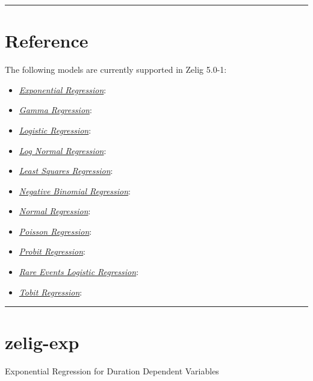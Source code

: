 \documentclass[letterpaper,10pt,english]{sphinxmanual}
\begin{document}
\bigskip\hrule{}\bigskip



\section{Reference}
\label{vignette:reference}
The following models are currently supported in Zelig 5.0-1:
\begin{itemize}
\item {} 
{\hyperref[zelig-exp:zexp]{\emph{Exponential Regression}}}: 

\item {} 
{\hyperref[zelig-gamma:zgamma]{\emph{Gamma Regression}}}: 

\item {} 
{\hyperref[zelig-logit:zlogit]{\emph{Logistic Regression}}}: 

\item {} 
{\hyperref[zelig-lognorm:zlognorm]{\emph{Log Normal Regression}}}: 

\item {} 
{\hyperref[zelig-ls:zls]{\emph{Least Squares Regression}}}: 

\item {} 
{\hyperref[zelig-negbin:znegbin]{\emph{Negative Binomial Regression}}}: 

\item {} 
{\hyperref[zelig-normal:znorm]{\emph{Normal Regression}}}: 

\item {} 
{\hyperref[zelig-poisson:zpoisson]{\emph{Poisson Regression}}}: 

\item {} 
{\hyperref[zelig-probit:zprobit]{\emph{Probit Regression}}}: 

\item {} 
{\hyperref[zelig-relogit:zrelogit]{\emph{Rare Events Logistic Regression}}}: 

\item {} 
{\hyperref[zelig-tobit:ztobit]{\emph{Tobit Regression}}}: 

\end{itemize}


\bigskip\hrule{}\bigskip



\section{zelig-exp}
\label{vignette:zelig-exp}\label{vignette:zexp}
Exponential Regression for Duration Dependent Variables
\end{document}
